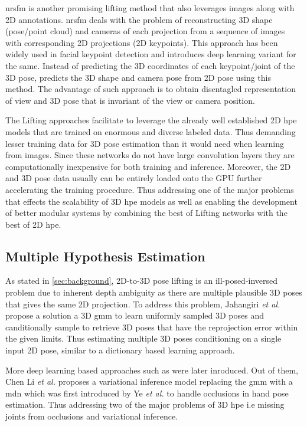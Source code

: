 \ac{nrsfm} is another promising lifting method that also leverages images along with 2D annotations. \ac{nrsfm} deals with the problem of reconstructing 3D shape (pose/point cloud) and cameras of each projection from a sequence of images with corresponding 2D projections (2D keypoints). This approach has been widely used in facial keypoint detection and \cite{deepNRSFM} introduces deep learning variant for the same. Instead of predicting the 3D coordinates of each keypoint/joint of the 3D pose, \cite{DistillNRSfM, c3dpo, deepNRSFM, nrsfm++} predicts the 3D shape and camera pose from 2D pose using this method. The advantage of such approach is to obtain disentagled representation of view and 3D pose that is invariant of the view or camera position.

The Lifting approaches facilitate to leverage the already well established 2D \ac{hpe} models that are trained on enormous and diverse labeled data. Thus demanding lesser training data for 3D pose estimation than it would need when learning from images. Since these networks do not have large convolution layers they are computationally inexpensive for both training and inference. Moreover, the 2D and 3D pose data usually can be entirely loaded onto the GPU further accelerating the training procedure. Thus addressing one of the major problems that effects the scalability of 3D \ac{hpe} models as well as enabling the development of better modular systems by combining the best of Lifting networks with the best of 2D \ac{hpe}.

\subsection{Multiple Hypothesis Estimation}
\label{subsec:multiple_hypothesis_estimation}

As stated in \ref{sec:background}, 2D-to-3D pose lifting is an ill-posed-inversed problem due to inherent depth ambiguity as there are multiple plausible 3D poses that gives the same 2D projection. To address this problem, Jahangiri \textit{et al.} \cite{jahangiri} propose a solution a 3D \ac{gmm} to learn uniformly sampled 3D poses and canditionally sample to retrieve 3D poses that have the reprojection error within the given limits. Thus estimating multiple 3D poses conditioning on a single input 2D pose, similar to a dictionary based learning approach. 

More deep learning based approaches such as \cite{weaklymultiple,multiplehypo,ordinalranking} were later inroduced. Out of them, Chen Li \textit{et al.} \cite{multiplehypo} proposes a variational inference model replacing the \ac{gmm} with a \ac{mdn} which was first introduced by Ye \textit{et al.} \cite{mixturedensitymodel} to handle occlusions in hand pose estimation. Thus addressing two of the major problems of 3D \ac{hpe} i.e missing joints from occlusions and variational inference. 

